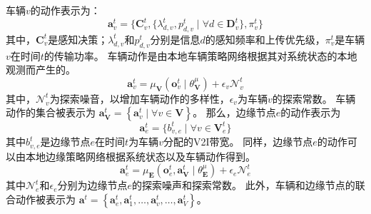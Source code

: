 车辆$v$的动作表示为：
\begin{equation}
	\boldsymbol{a}_{v}^{t} = \{ \mathbf{C}_v^t,  \{ \lambda_{d, v}^{t}, p_{d, v}^{t} \mid \forall d \in \mathbf{D}_{v}^t \} , \pi_v^t   \}
\end{equation}
其中，$\mathbf{C}_v^t$是感知决策；$\lambda_{d, v}^{t}$和$p_{d, v}^{t}$分别是信息$d$的感知频率和上传优先级，$\pi_v^t$是车辆$v$在时间$t$的传输功率。
车辆动作是由本地车辆策略网络根据其对系统状态的本地观测而产生的。
\begin{equation}
	\boldsymbol{a}_{v}^{t}=\mu_{\mathbf{V}}\left(\boldsymbol{o}_{v}^{t} \mid \theta_{\mathbf{V}}^{\mu}\right)+\epsilon_{v} \mathcal{N}_{v}^{t}
\end{equation}
\noindent 其中，$\mathcal{N}_{v}^{t}$为探索噪音，以增加车辆动作的多样性，$\epsilon_{v}$为车辆$v$的探索常数。
车辆动作的集合被表示为 $\boldsymbol{a}_{\mathbf{V}}^{t} = \left\{\boldsymbol{a}_{v}^{t}\mid \forall v \in \mathbf{V}\right\}$。
那么，边缘节点$e$的动作表示为
\begin{equation}
	\boldsymbol{a}_{e}^{t} = \{b_{v, e}^{t} \mid \forall v \in \mathbf{V}_{e}^{t}\}
\end{equation}
其中$b_{v, e}^t$是边缘节点$e$在时间$t$为车辆$v$分配的V2I带宽。
同样，边缘节点$e$的动作可以由本地边缘策略网络根据系统状态以及车辆动作得到。
\begin{equation}
	\boldsymbol{a}_{e}^{t}=\mu_{\mathbf{E}}\left(\boldsymbol{o}_{e}^{t},  \boldsymbol{a}_{\boldsymbol{\mathbf{V}}}^{t} \mid \theta_{\mathbf{E}}^{\mu}\right)+\epsilon_{e} \mathcal{N}_{e}^{t}
\end{equation}
\noindent 其中$\mathcal{N}_{e}^{t}$和$\epsilon_{e}$分别为边缘节点$e$的探索噪声和探索常数。
此外，车辆和边缘节点的联合动作被表示为 $\boldsymbol{a}^{t}= \left\{\boldsymbol{a}_{e}^{t}, \boldsymbol{a}_{1}^{t}, \ldots, \boldsymbol{a}_{v}^{t}, \ldots, \boldsymbol{a}_{V}^{t}\right\}$。

